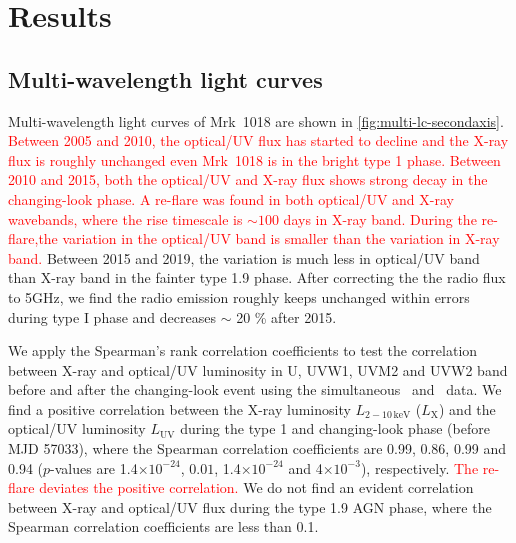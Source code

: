 \section{Results}
\label{sec:result}
\subsection{Multi-wavelength light curves}
\label{sec:multi-lc}%
Multi-wavelength light curves of Mrk~1018 are shown in \autoref{fig:multi-lc-secondaxis}. 
\textcolor{red}{Between 2005 and 2010, the optical/UV flux has started to decline and the X-ray flux is roughly unchanged even Mrk~1018 is in the bright type 1 phase. Between 2010 and 2015, both the optical/UV and X-ray flux shows strong decay in the changing-look phase. A re-flare was found in both optical/UV and X-ray wavebands, where the rise timescale is $\sim 100$ days in X-ray band. During the re-flare,the variation in the optical/UV band is smaller than the variation in X-ray band.} Between 2015 and 2019, the variation is much less in optical/UV band than X-ray band in the fainter type 1.9 phase. After correcting the the radio flux to 5GHz, we find the radio emission roughly keeps unchanged within errors during type I phase and decreases $\sim$ 20 \% after 2015.

We apply the Spearman's rank correlation coefficients to test the correlation between X-ray and optical/UV luminosity in U, UVW1, UVM2 and UVW2 band before and after the changing-look event using the simultaneous \xrt\, and \uvot\, data. We find a positive correlation between the X-ray luminosity ${L_\mathrm{{2-10\,keV}}}$ (${L_\mathrm{{X}}}$) and the optical/UV luminosity ${L_\mathrm{{UV}}}$ during the type 1 and changing-look phase (before MJD 57033), where the Spearman correlation coefficients are 0.99, 0.86, 0.99 and 0.94 ($p$-values are 1.4$\times10^{-24}$, $0.01$, 1.4$\times10^{-24}$ and 4$\times10^{-3}$), respectively. \textcolor{red}{The re-flare deviates the positive correlation.} We do not find an evident correlation between X-ray and optical/UV flux during the type 1.9 AGN phase, where the Spearman correlation coefficients are less than 0.1. 

